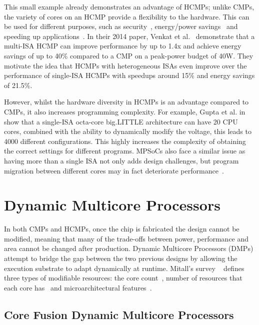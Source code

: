 This small example already demonstrates an advantage of HCMPs; unlike CMPs, the variety of cores on an HCMP provide a flexibility to the hardware.
This can be used for different purposes, such as security~\cite{hipstr}, energy/power savings~\cite{venkatharnessingISA} and speeding up applications~\cite{venkatharnessingISA}.
In their 2014 paper, Venkat et al.~\cite{venkatharnessingISA} demonstrate that a multi-ISA HCMP can improve performance by up to 1.4x and achieve energy savings of up to 40\% compared to a CMP on a peak-power budget of 40W.
They motivate the idea that HCMPs with heterogeneous ISAs even improve over the performance of single-ISA HCMPs with speedups around 15\% and energy savings of 21.5\%.

However, whilst the hardware diversity in HCMPs is an advantage compared to CMPs, it also increases programming complexity.
For example, Gupta et al. in ~\cite{dypo} show that a single-ISA octa-core big.LITTLE architecture can have 20 CPU cores, combined with the ability to dynamically modify the voltage, this leads to 4000 different configurations.
This highly increases the complexity of obtaining the correct settings for different programs.
MPSoCs also face a similar issue as having more than a single ISA not only adds design challenges, but program migration between different cores may in fact deteriorate performance~\cite{asplos2012}.

\section{Dynamic Multicore Processors}


In both CMPs and HCMPs, once the chip is fabricated the design cannot be modified, meaning that many of the trade-offs between power, performance and area cannot be changed after production.
Dynamic Multicore Processors (DMPs) attempt to bridge the gap between the two previous designs by allowing the execution substrate to adapt dynamically at runtime.
Mitall's survey ~\cite{MittalSurv2016} defines three types of modifiable resources: the core count~\cite{ipek2007CoreFusion}, number of resources that each core has~\cite{Homayoun3DPooling2012} and microarchitectural features~\cite{fallinhetblock2014,BauerRSE08,tavanaElastic}.

\subsection{Core Fusion Dynamic Multicore Processors}

